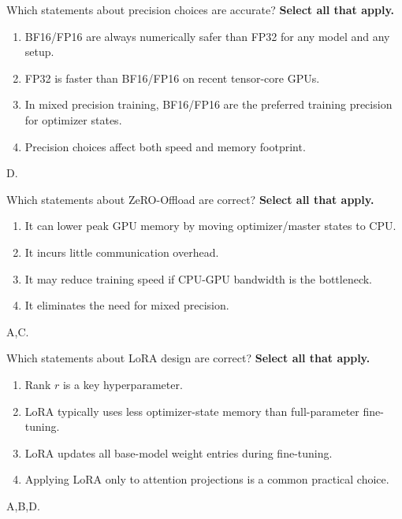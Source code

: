 
\question[4]
Which statements about precision choices are accurate?  \textbf{Select all that apply.}
\begin{enumerate}
\item BF16/FP16 are always numerically safer than FP32 for any model and any setup.
\item FP32 is faster than BF16/FP16 on recent tensor-core GPUs.
\item In mixed precision training, BF16/FP16 are the preferred training precision for optimizer states.
\item Precision choices affect both speed and memory footprint.
\end{enumerate}
\begin{soln}
D.
\end{soln}

\question[4]
Which statements about ZeRO-Offload are correct? \textbf{Select all that apply.}
\begin{enumerate}
\item It can lower peak GPU memory by moving optimizer/master states to CPU.
\item It incurs little communication overhead.
\item It may reduce training speed if CPU-GPU bandwidth is the bottleneck.
\item It eliminates the need for mixed precision.
\end{enumerate}
\begin{soln}
A,C.
\end{soln}

\question[4]
Which statements about LoRA design are correct? \textbf{Select all that apply.}
\begin{enumerate}
\item Rank $r$  is a key hyperparameter.
\item LoRA typically uses less optimizer-state memory than full-parameter fine-tuning.
\item LoRA updates all base-model weight entries during fine-tuning. 
\item Applying LoRA only to attention projections is a common practical choice.
\end{enumerate}
\begin{soln}
A,B,D.
\end{soln}

